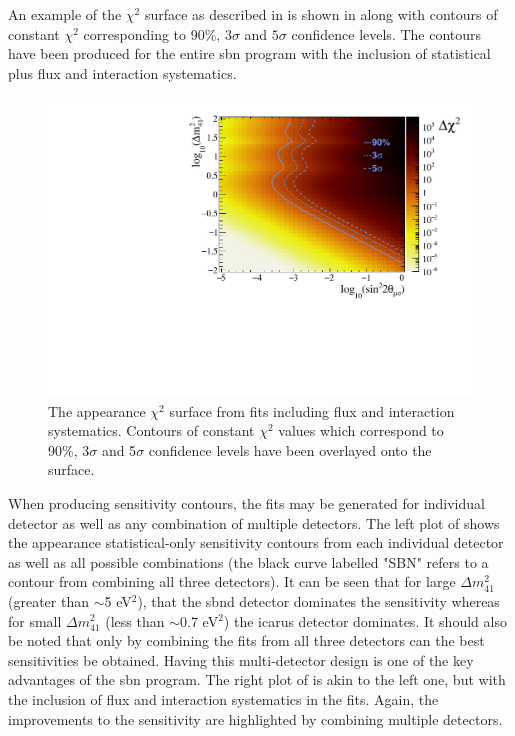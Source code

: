 An example of the $\chi^2$ surface as described in  is shown in  along with contours of constant $\chi^2$ corresponding to 90\%, $3\sigma$ and $5\sigma$ confidence levels. The contours have been produced for the entire \gls{sbn} program with the inclusion of statistical plus flux and interaction systematics. 
\begin{figure}[h!]
    \centering
    \includegraphics[width = \largefigwidth]{figures-chap6/exclusion_contours/nue_app_03d1_chi2_surface.pdf}
    \caption[\nue appearance contours overlayed on the $\chi^2$ surface.]{The \nue appearance $\chi^2$ surface from fits including flux and interaction systematics. Contours of constant $\chi^2$ values which correspond to 90\%, 3$\sigma$ and 5$\sigma$ confidence levels have been overlayed onto the surface.}
    \label{fig:nue_app_chisq_surface}
\end{figure}

When producing sensitivity contours, the fits may be generated for individual detector as well as any combination of multiple detectors. The left plot of  shows the \nue appearance statistical-only sensitivity contours from each individual detector as well as all possible combinations (the black curve labelled "SBN" refers to a contour from combining all three detectors). It can be seen that for large $\Delta m^2_{41}$ (greater than $\sim$5 eV$^2$), that the \gls{sbnd} detector dominates the sensitivity whereas for small $\Delta m^2_{41}$ (less than $\sim$0.7 eV$^2$) the \gls{icarus} detector dominates. It should also be noted that only by combining the fits from all three detectors can the best sensitivities be obtained. Having this multi-detector design is one of the key advantages of the \gls{sbn} program. The right plot of  is akin to the left one, but with the inclusion of flux and interaction systematics in the fits. Again, the improvements to the sensitivity are highlighted by combining multiple detectors. 

